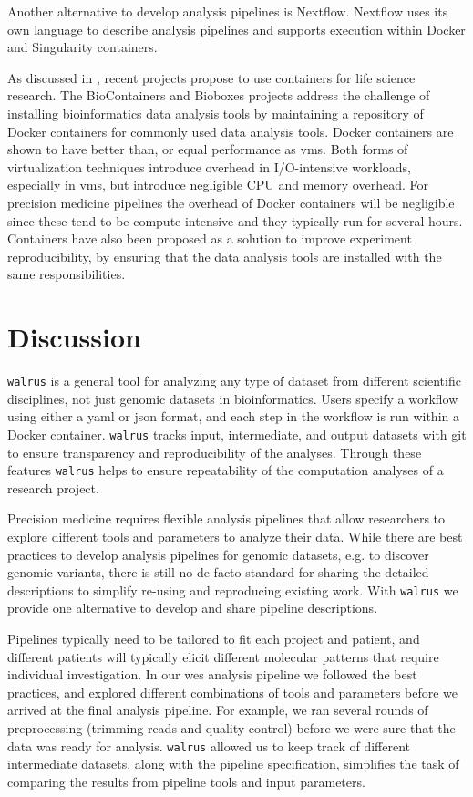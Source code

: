 Another alternative to develop analysis pipelines is
Nextflow.\cite{di2017nextflow} Nextflow uses its own language to describe
analysis pipelines and supports execution within Docker and Singularity
containers. 

As discussed in \cite{NIK, fjukstad2017review}, recent projects propose to use
containers for life science research. The BioContainers and
Bioboxes\cite{belmann2015bioboxes} projects address the challenge of installing
bioinformatics data analysis tools by maintaining a repository of Docker
containers for commonly used data analysis tools. Docker containers are shown to
have better than, or equal performance as \glspl{vm}.\cite{di2015impact} Both
forms of virtualization techniques introduce overhead in I/O-intensive
workloads, especially in \glspl{vm}, but introduce negligible CPU and memory
overhead. For precision medicine pipelines the overhead of Docker containers
will be negligible since these tend to be compute-intensive and they typically
run for several hours.\cite{di2015impact} Containers have also been proposed as
a solution to improve experiment reproducibility, by ensuring that the data
analysis tools are installed with the same
responsibilities.\cite{boettiger2015introduction} 

\section{Discussion}
\texttt{walrus} is a general tool for analyzing any type of dataset from
different scientific disciplines, not just genomic datasets in bioinformatics.
Users specify a workflow using either a \gls{yaml} or \gls{json} format, and
each step in the workflow is run within a Docker container. \texttt{walrus}
tracks input, intermediate, and output datasets with git to ensure transparency
and reproducibility of the analyses. Through these features \texttt{walrus}
helps to ensure repeatability of the computation analyses of a research project. 

Precision medicine requires flexible analysis pipelines that allow researchers
to explore different tools and parameters to analyze their data.  While there
are best practices to develop analysis pipelines for genomic datasets, e.g. to
discover genomic variants, there is still no de-facto standard for sharing the
detailed descriptions to simplify re-using and reproducing existing work. With
\texttt{walrus} we provide one alternative to develop and share pipeline
descriptions.  

Pipelines typically need to be tailored to fit each project and patient, and
different patients will typically elicit different molecular patterns that
require individual investigation.  In our \gls{wes} analysis pipeline we
followed the best practices, and explored different combinations of tools and
parameters before we arrived at the final analysis pipeline. For example, we ran
several rounds of preprocessing (trimming reads and quality control) before we
were sure that the data was ready for analysis. \texttt{walrus} allowed us to
keep track of different intermediate datasets, along with the pipeline
specification, simplifies the task of comparing the results from pipeline tools
and input parameters. 

